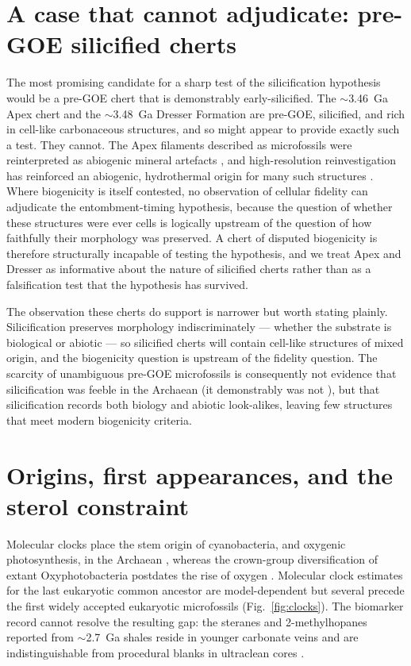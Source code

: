 \documentclass[11pt]{article}
\begin{document}
\section{A case that cannot adjudicate: pre-GOE silicified cherts}\label{sec:falsify}

The most promising candidate for a sharp test of the silicification hypothesis would be a pre-GOE
chert that is demonstrably early-silicified. The $\sim$3.46~Ga Apex chert and the $\sim$3.48~Ga
Dresser Formation are pre-GOE, silicified, and rich in cell-like carbonaceous structures, and so
might appear to provide exactly such a test. They cannot. The Apex filaments described as
microfossils \citep{Schopf1993} were reinterpreted as abiogenic mineral artefacts
\citep{Brasier2002}, and high-resolution reinvestigation has reinforced an abiogenic, hydrothermal
origin for many such structures \citep{Wacey2014}. Where biogenicity is itself contested, no
observation of cellular fidelity can adjudicate the entombment-timing hypothesis, because the
question of whether these structures were ever cells is logically upstream of the question of how
faithfully their morphology was preserved. A chert of disputed biogenicity is therefore structurally
incapable of testing the hypothesis, and we treat Apex and Dresser as informative about the nature
of silicified cherts rather than as a falsification test that the hypothesis has survived.

The observation these cherts do support is narrower but worth stating plainly. Silicification
preserves morphology indiscriminately --- whether the substrate is biological or abiotic --- so
silicified cherts will contain cell-like structures of mixed origin, and the biogenicity question is
upstream of the fidelity question. The scarcity of unambiguous pre-GOE microfossils is consequently
not evidence that silicification was feeble in the Archaean (it demonstrably was not
\citep{Siever1992,Perry2007}), but that silicification records both biology and abiotic look-alikes,
leaving few structures that meet modern biogenicity criteria.

\section{Origins, first appearances, and the sterol constraint}

Molecular clocks place the stem origin of cyanobacteria, and oxygenic photosynthesis, in the Archaean
\citep{Fournier2021}, whereas the crown-group diversification of extant Oxyphotobacteria postdates
the rise of oxygen \citep{Shih2017}. Molecular clock estimates for the last eukaryotic common
ancestor are model-dependent but several precede the first widely accepted eukaryotic microfossils
\citep{Betts2018,Eme2014} (Fig.~\ref{fig:clocks}). The biomarker record cannot resolve the resulting
gap: the steranes and 2-methylhopanes reported from $\sim$2.7~Ga shales \citep{Brocks1999} reside in
younger carbonate veins \citep{Rasmussen2008} and are indistinguishable from procedural blanks in
ultraclean cores \citep{French2015}.
\end{document}
